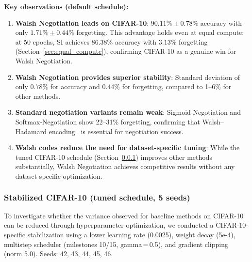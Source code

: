 \documentclass[preprint,review,12pt]{elsarticle}
\begin{document}
\textbf{Key observations (default schedule):}
\begin{enumerate}
\item \textbf{Walsh Negotiation leads on CIFAR-10}: $90.11\% \pm 0.78\%$ accuracy with only $1.71\% \pm 0.44\%$ forgetting. This advantage holds even at equal compute: at 50 epochs, SI achieves $86.38\%$ accuracy with $3.13\%$ forgetting (Section~\ref{sec:equal_compute}), confirming CIFAR-10 as a genuine win for Walsh Negotiation.

\item \textbf{Walsh Negotiation provides superior stability}: Standard deviation of only $0.78\%$ for accuracy and $0.44\%$ for forgetting, compared to 1--6\% for other methods.

\item \textbf{Standard negotiation variants remain weak}: Sigmoid-Negotiation and Softmax-Negotiation show 22--31\% forgetting, confirming that Walsh--Hadamard encoding~\cite{korhan2023negotiated} is essential for negotiation success.

\item \textbf{Walsh codes reduce the need for dataset-specific tuning}: While the tuned CIFAR-10 schedule (Section~\ref{sec:stabilized_cifar10}) improves other methods substantially, Walsh Negotiation achieves competitive results without any dataset-specific optimization.
\end{enumerate}

\subsubsection{Stabilized CIFAR-10 (tuned schedule, 5 seeds)}
\label{sec:stabilized_cifar10}

To investigate whether the variance observed for baseline methods on CIFAR-10 can be reduced through hyperparameter optimization, we conducted a CIFAR-10-specific stabilization using a lower learning rate (0.0025), weight decay (5e-4), multistep scheduler (milestones 10/15, gamma\,=\,0.5), and gradient clipping (norm 5.0). Seeds: 42, 43, 44, 45, 46.
\end{document}
